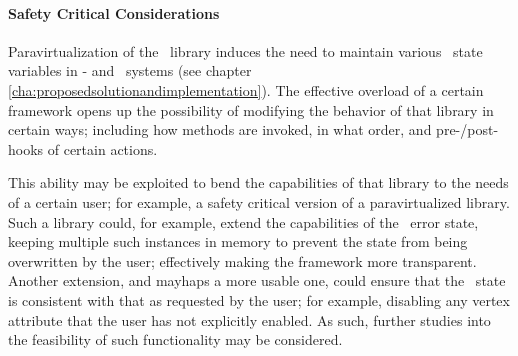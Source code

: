 \paragraph{Safety Critical Considerations}
\label{par:futurework_safetycriticalconsiderations}
Paravirtualization of the \dvttermopenglestwopointo\ library induces the need to maintain various \dvttermopengl\ state variables in \dvttermtarget - and \dvttermhost\ systems (see chapter \ref{cha:proposedsolutionandimplementation}).
The effective overload of a certain framework opens up the possibility of modifying the behavior of that library in certain ways; including how methods are invoked, in what order, and pre-/post-hooks of certain actions.

This ability may be exploited to bend the capabilities of that library to the needs of a certain user; for example, a safety critical version of a paravirtualized library.
Such a library could, for example, extend the capabilities of the \dvttermopengl\ error state, keeping multiple such instances in memory to prevent the state from being overwritten by the user; effectively making the framework more transparent.
Another extension, and mayhaps a more usable one, could ensure that the \dvttermopengl\ state is consistent with that as requested by the user; for example, disabling any vertex attribute that the user has not explicitly enabled.
As such, further studies into the feasibility of such functionality may be considered.
